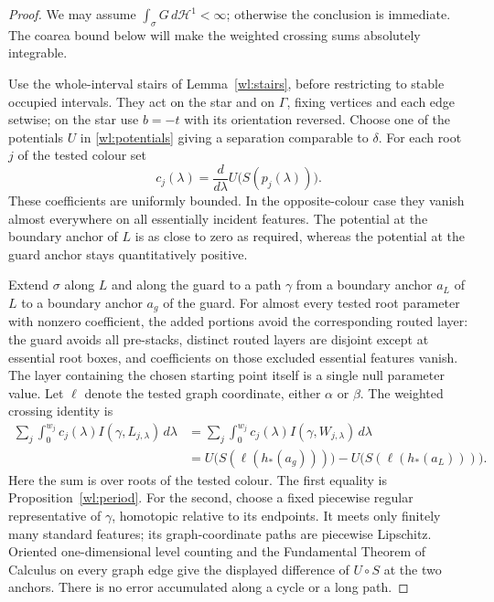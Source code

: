 \begin{proof}
We may assume $\int_\sigma G\,d\mathcal H^1<\infty$; otherwise
the conclusion is immediate.  The coarea bound below will make the
weighted crossing sums absolutely integrable.

Use the whole-interval stairs of Lemma~\ref{wl:stairs}, before
restricting to stable occupied intervals.  They act on the star and
on $\Gamma$, fixing vertices and each edge setwise; on the star use
$b=-t$ with its orientation reversed.  Choose one of the potentials
$U$ in \eqref{wl:potentials} giving a separation comparable to
$\delta$.  For each root $j$ of the tested colour set
\begin{equation}\label{wl:crossing-coefficient}
 c_j(\lambda)=\frac{d}{d\lambda}
                 U\bigl(S(p_j(\lambda))\bigr).
\end{equation}
These coefficients are uniformly bounded.  In the opposite-colour
case they vanish almost everywhere on all essentially incident
features.  The potential at the boundary anchor of $L$ is as close
to zero as required, whereas the potential at the guard anchor stays
quantitatively positive.

Extend $\sigma$ along $L$ and along the guard to a path $\gamma$
from a boundary anchor $a_L$ of $L$ to a boundary anchor $a_g$ of
the guard.  For almost every tested root parameter with nonzero
coefficient, the added portions avoid the corresponding routed
layer: the guard avoids all pre-stacks, distinct routed layers are
disjoint except at essential root boxes, and coefficients on those
excluded essential features vanish.  The layer containing the
chosen starting point itself is a single null parameter value.
Let $\ell$ denote the tested graph coordinate, either $\alpha$ or
$\beta$.  The weighted crossing identity is
\begin{equation}\label{wl:weighted-period}
\begin{aligned}
 \sum_j\int_0^{w_j}c_j(\lambda)I(\gamma,L_{j,\lambda})\,d\lambda
 &=\sum_j\int_0^{w_j}c_j(\lambda)I(\gamma,W_{j,\lambda})\,d\lambda\\
 &=U\bigl(S(\ell(h_*(a_g)))\bigr)
       -U\bigl(S(\ell(h_*(a_L)))\bigr).
\end{aligned}
\end{equation}
Here the sum is over roots of the tested colour.  The first equality
is Proposition~\ref{wl:period}.  For the second, choose a fixed
piecewise regular representative of $\gamma$, homotopic relative
to its endpoints.  It meets only finitely many standard features;
its graph-coordinate
paths are piecewise Lipschitz.  Oriented one-dimensional level
counting and the Fundamental Theorem of Calculus on every graph
edge give the displayed difference of $U\circ S$ at the two anchors.
There is no error accumulated along a cycle or a long path.


\end{proof}

